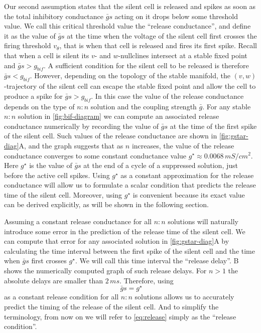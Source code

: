 \documentclass[utf8]{frontiersFPHY} %
\begin{document}
Our second assumption states that the silent cell is released and spikes as soon as the total inhibitory conductance $\bar g s$ acting on it drops below some threshold value.
We call this critical threshold value the ``release conductance'', and define it as the value of $\bar g s$ at the time when the voltage of the silent cell first crosses the firing threshold $v_{\theta}$, that is when that cell is released and fires its first spike.
Recall that when a cell is silent its $v$- and $w$-nullclines intersect at a stable fixed point and $\bar g s > g_{bif}$.
A sufficient condition for the silent cell to be released is therefore $\bar g s < g_{bif}$.
However, depending on the topology of the stable manifold, the $(v,w)$-trajectory of the silent cell can escape the stable fixed point and allow the cell to produce a spike for $\bar g s > g_{bif}$.
In this case the value of the release conductance depends on the type of $n:n$ solution and the coupling strength $\bar g$.
For any stable $n:n$ solution in \cref{fig:bif-diagram} we can compute an associated release conductance numerically by recording the value of $\bar g s$ at the time of the first spike of the silent cell.
Such values of the release conductance are shown in \cref{fig:gstar-diag}A, and the graph suggests that as $n$ increases, the value of the release conductance converges to some constant conductance value $g^{\star} \approx 0.0068\, \si{mS/cm^2}$.
Here $g^{\star}$ is the value of $\bar g s$ at the end of a cycle of a suppressed solution, just before the active cell spikes.
Using $g^{\star}$ as a constant approximation for the release conductance will allow us to formulate a scalar condition that predicts the release time of the silent cell.
Moreover, using $g^{\star}$ is convenient because its exact value can be derived explicitly, as will be shown in the following section.

Assuming a constant release conductance for all $n:n$ solutions will naturally introduce some error in the prediction of the release time of the silent cell.
We can compute that error for any associated solution in \cref{fig:gstar-diag}A by calculating the time interval between the first spike of the silent cell and the time when $\bar g s$ first crosses $g^{\star}$.
We will call this time interval the ``release delay''.
B shows the numerically computed graph of such release delays.
For $n>1$ the absolute delays are smaller than $2\, \si{ms}$.
Therefore, using
\begin{equation}
	~\label{eq:release}
	\bar g s=g^{\star}
\end{equation}
as a constant release condition for all $n:n$ solutions allows us to accurately predict the timing of the release of the silent cell.
And to simplify the terminology, from now on we will refer to \cref{eq:release} simply as the ``release condition''.
\end{document}
